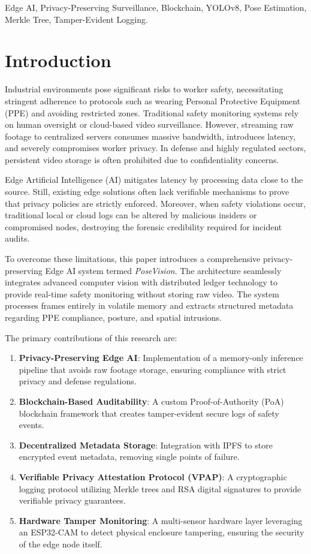 \documentclass[conference]{IEEEtran}
\begin{document}
\begin{IEEEkeywords}
Edge AI, Privacy-Preserving Surveillance, Blockchain, YOLOv8, Pose Estimation, Merkle Tree, Tamper-Evident Logging.
\end{IEEEkeywords}

\section{Introduction}
Industrial environments pose significant risks to worker safety, necessitating stringent adherence to protocols such as wearing Personal Protective Equipment (PPE) and avoiding restricted zones. Traditional safety monitoring systems rely on human oversight or cloud-based video surveillance. However, streaming raw footage to centralized servers consumes massive bandwidth, introduces latency, and severely compromises worker privacy. In defense and highly regulated sectors, persistent video storage is often prohibited due to confidentiality concerns.

Edge Artificial Intelligence (AI) mitigates latency by processing data close to the source. Still, existing edge solutions often lack verifiable mechanisms to prove that privacy policies are strictly enforced. Moreover, when safety violations occur, traditional local or cloud logs can be altered by malicious insiders or compromised nodes, destroying the forensic credibility required for incident audits. 

To overcome these limitations, this paper introduces a comprehensive privacy-preserving Edge AI system termed \textit{PoseVision}. The architecture seamlessly integrates advanced computer vision with distributed ledger technology to provide real-time safety monitoring without storing raw video. The system processes frames entirely in volatile memory and extracts structured metadata regarding PPE compliance, posture, and spatial intrusions. 

The primary contributions of this research are:
\begin{enumerate}
    \item \textbf{Privacy-Preserving Edge AI}: Implementation of a memory-only inference pipeline that avoids raw footage storage, ensuring compliance with strict privacy and defense regulations.
    \item \textbf{Blockchain-Based Auditability}: A custom Proof-of-Authority (PoA) blockchain framework that creates tamper-evident secure logs of safety events.
    \item \textbf{Decentralized Metadata Storage}: Integration with IPFS to store encrypted event metadata, removing single points of failure.
    \item \textbf{Verifiable Privacy Attestation Protocol (VPAP)}: A cryptographic logging protocol utilizing Merkle trees and RSA digital signatures to provide verifiable privacy guarantees.
    \item \textbf{Hardware Tamper Monitoring}: A multi-sensor hardware layer leveraging an ESP32-CAM to detect physical enclosure tampering, ensuring the security of the edge node itself.
\end{enumerate}
\end{document}
